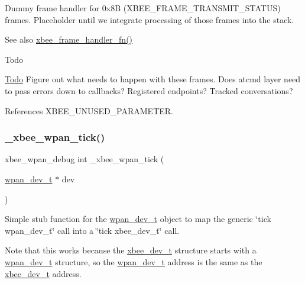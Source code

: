 Dummy frame handler for 0x8B (X\+B\+E\+E\+\_\+\+F\+R\+A\+M\+E\+\_\+\+T\+R\+A\+N\+S\+M\+I\+T\+\_\+\+S\+T\+A\+T\+US) frames. Placeholder until we integrate processing of those frames into the stack. \begin{DoxySeeAlso}{See also}
\hyperlink{group__xbee__device_ga3e6f2b540e8cec7a69ef0b0166da14ff}{xbee\+\_\+frame\+\_\+handler\+\_\+fn()}
\end{DoxySeeAlso}
\begin{DoxyRefDesc}{Todo}
\item[\hyperlink{todo__todo000030}{Todo}]Figure out what needs to happen with these frames. Does atcmd layer need to pass errors down to callbacks? Registered endpoints? Tracked conversations? \end{DoxyRefDesc}


References X\+B\+E\+E\+\_\+\+U\+N\+U\+S\+E\+D\+\_\+\+P\+A\+R\+A\+M\+E\+T\+ER.

\mbox{\label{group__xbee__wpan_ga7c0492680badfd8ee30c5d797395394f}} 
\subsubsection{\texorpdfstring{\+\_\+xbee\+\_\+wpan\+\_\+tick()}{\_xbee\_wpan\_tick()}}
{\footnotesize\ttfamily xbee\+\_\+wpan\+\_\+debug int \+\_\+xbee\+\_\+wpan\+\_\+tick (\begin{DoxyParamCaption}\item[{\hyperlink{structwpan__dev__t}{wpan\+\_\+dev\+\_\+t} $\ast$}]{dev }\end{DoxyParamCaption})}

Simple stub function for the \hyperlink{structwpan__dev__t}{wpan\+\_\+dev\+\_\+t} object to map the generic \char`\"{}tick wpan\+\_\+dev\+\_\+t\char`\"{} call into a \char`\"{}tick xbee\+\_\+dev\+\_\+t\char`\"{} call.

Note that this works because the \hyperlink{structxbee__dev__t}{xbee\+\_\+dev\+\_\+t} structure starts with a \hyperlink{structwpan__dev__t}{wpan\+\_\+dev\+\_\+t} structure, so the \hyperlink{structwpan__dev__t}{wpan\+\_\+dev\+\_\+t} address is the same as the \hyperlink{structxbee__dev__t}{xbee\+\_\+dev\+\_\+t} address.

